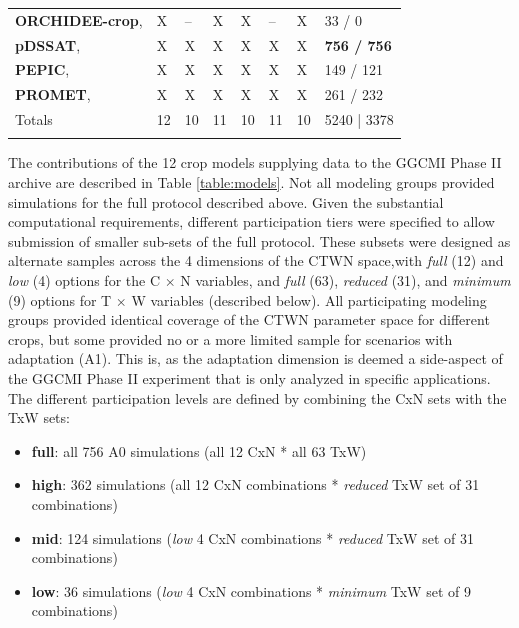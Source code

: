 \documentclass[gmd, manuscript]{copernicus} %
\begin{document}
\begin{table}[t]
\begin{tabular}{p{6cm} p{1cm} p{1cm} p{1cm} p{1cm} p{1cm} p{1cm} p{1.9cm}}
        {\textbf{ORCHIDEE-crop},\citet{Wu2016}} & {X} & {--} & {X} & {X} & {--} & {X} & {33 / 0}\\ \middlehline
        {\textbf{pDSSAT},       \citet{Elliott2014b, JONES2003235}} & {X} & {X} & {X} & {X} & {X} & {X} & {\textbf{756 / 756}}\\ \middlehline
        {\textbf{PEPIC},        \citet{LIU2016164, LIU2016}} & {X} & {X} & {X} & {X} & {X} & {X} & {149 / 121}\\ \middlehline
        {\textbf{PROMET},       \citet{Hank2015, MAUSER2015}} & {X} & {X} & {X} & {X} & {X} & {X} & {261 / 232}\\ \middlehline
        {Totals} & {12} & {10} & {11} & {10} & {11} & {10} & {5240 | 3378}\\
        \bottomhline
    \end{tabular}
\end{table}

The contributions of the 12 crop models supplying data to the GGCMI Phase II archive are described in Table \ref{table:models}.
Not all modeling groups provided simulations for the full protocol described above. 
Given the substantial computational requirements, different participation tiers were specified to allow submission of smaller sub-sets of the full protocol. 
These subsets were designed as alternate samples across the 4 dimensions of the CTWN space,with \textit{full} (12) and \textit{low} (4) options for the C $\times$ N variables, and \textit{full} (63), \textit{reduced} (31), and \textit{minimum} (9) options for T $\times$ W variables (described below). All participating modeling groups provided identical coverage of the CTWN parameter space for different crops, but some provided no or a more limited sample for scenarios with adaptation (A1).
This is, as the adaptation dimension is deemed a side-aspect of the GGCMI Phase II experiment that is only analyzed in specific applications.
The different participation levels are defined by combining the CxN sets with the TxW sets:
\begin{itemize}
\item{\textbf{full}: all 756 A0 simulations (all 12 CxN * all 63 TxW)}
\item{\textbf{high}: 362 simulations (all 12 CxN combinations * \textit{reduced} TxW set of 31 combinations)}
\item{\textbf{mid}: 124 simulations (\textit{low} 4 CxN combinations * \textit{reduced} TxW set of 31 combinations)}
\item{\textbf{low}: 36 simulations (\textit{low} 4 CxN combinations * \textit{minimum} TxW set of 9 combinations)}
\end{itemize}
\end{document}
